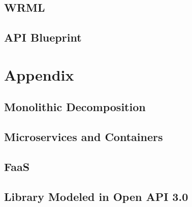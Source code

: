 \documentclass[12pt,oneside]{book} %
\begin{document}
\section{WRML}
\section{API Blueprint}

\chapter{Appendix}
\section{Monolithic Decomposition}
\section{Microservices and Containers}
\section{FaaS}
\section{Library Modeled in Open API 3.0}



\end{document}
